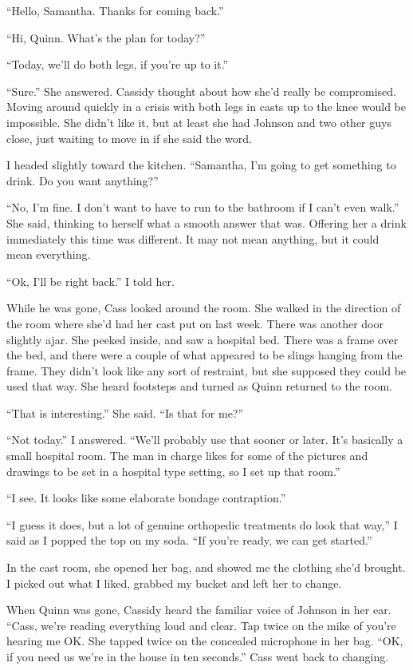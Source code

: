 ``Hello, Samantha. Thanks for coming back.''

``Hi, Quinn. What's the plan for today?''

``Today, we'll do both legs, if you're up to it.''

``Sure.'' She answered. Cassidy thought about how she'd really be compromised. Moving
around quickly in a crisis with both legs in casts up to the knee would be impossible. She
didn't like it, but at least she had Johnson and two other guys close, just waiting to move in
if she said the word.

I headed slightly toward the kitchen. ``Samantha, I'm going to get something to drink. Do
you want anything?''

``No, I'm fine. I don't want to have to run to the bathroom if I can't even walk.'' She
said, thinking to herself what a smooth answer that was. Offering her a drink immediately this
time was different. It may not mean anything, but it could mean everything.

``Ok, I'll be right back.'' I told her.

While he was gone, Cass looked around the room. She walked in the direction of the room
where she'd had her cast put on last week. There was another door slightly ajar. She peeked
inside, and saw a hospital bed. There was a frame over the bed, and there were a couple of what
appeared to be slings hanging from the frame. They didn't look like any sort of restraint, but
she supposed they could be used that way. She heard footsteps and turned as Quinn returned to
the room.

``That is interesting.'' She said. ``Is that for me?''

``Not today.'' I answered. ``We'll probably use that sooner or later. It's basically a
small
hospital room. The man in charge likes for some of the pictures and drawings to be set in a
hospital type setting, so I set up that room.''

``I see. It looks like some elaborate bondage contraption.''

``I guess it does, but a lot of genuine orthopedic treatments do look that way,'' I said
as
I popped the top on my soda. ``If you're ready, we can get started.''

In the cast room, she opened her bag, and showed me the clothing she'd brought. I picked
out what I liked, grabbed my bucket and left her to change.

When Quinn was gone, Cassidy heard the familiar voice of Johnson in her ear. ``Cass, we're
reading everything loud and clear. Tap twice on the mike of you're hearing me OK. She tapped
twice on the concealed microphone in her bag. ``OK, if you need us we're in the house in ten
seconds.'' Cass went back to changing.

